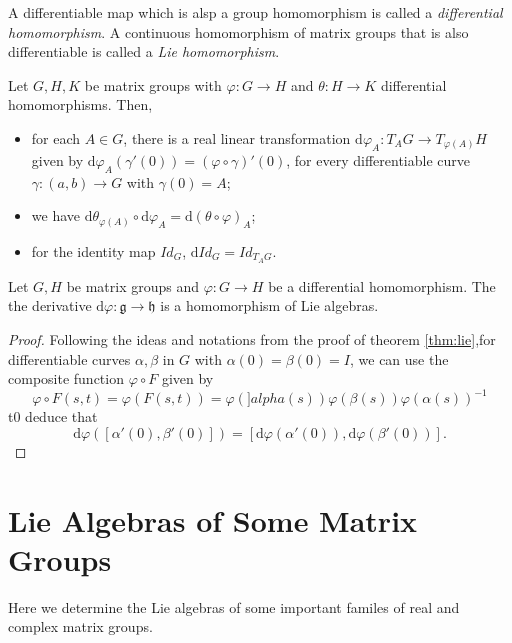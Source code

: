 A differentiable map which is alsp a group homomorphism is called a {\it differential homomorphism}.
A continuous homomorphism of matrix groups that is also differentiable is called a {\it Lie homomorphism}.

\begin{proposition}
  Let \(G,H,K\) be matrix groups with \(\varphi:G\longrightarrow H\) and \(\theta:H\longrightarrow K\)
  differential homomorphisms. Then,
  \begin{itemize}
    \item[\((i)\)] for each \(A\in G\), there is a real linear transformation \(\text{d}\varphi_A:T_AG\longrightarrow T_{\varphi(A)}H\)
      given by \(\text{d}\varphi_A(\gamma'(0))=(\varphi\circ\gamma)'(0)\), for every differentiable
      curve \(\gamma:(a,b)\longrightarrow G\) with \(\gamma(0)=A\);
    \item[\((ii)\)] we have \(\text{d}\theta_{\varphi(A)}\circ\text{d}\varphi_A=\text{d}(\theta\circ\varphi)_A\);
    \item[\((iii)\)] for the identity map \(Id_G\), \(\text{d}Id_G=Id_{T_AG}\).
  \end{itemize}
\end{proposition}

\begin{theorem}
  Let \(G,H\) be matrix groups and \(\varphi:G\longrightarrow H\) be a differential homomorphism.
  The the derivative \(\text{d}\varphi:\mathfrak{g}\longrightarrow\mathfrak{h}\) is a
  homomorphism of Lie algebras.
\end{theorem}

\begin{proof}
  Following the ideas and notations from the proof of theorem \ref{thm:lie},for
  differentiable curves \(\alpha,\beta\) in \(G\) with \(\alpha(0)=\beta(0)=I\), we can use
  the composite function \(\varphi\circ F\) given by
  \[ \varphi\circ F(s,t)=\varphi(F(s,t))=\varphi(]alpha(s))\varphi(\beta(s))\varphi(\alpha(s))^{-1} \]
  t0 deduce that
  \[\text{d}\varphi\left([\alpha'(0),\beta'(0)]\right)=[\text{d}\varphi(\alpha'(0)),\text{d}\varphi(\beta'(0))]. \]
\end{proof}

\section{Lie Algebras of Some Matrix Groups}

Here we determine the Lie algebras of some important familes of real and complex matrix
groups.

